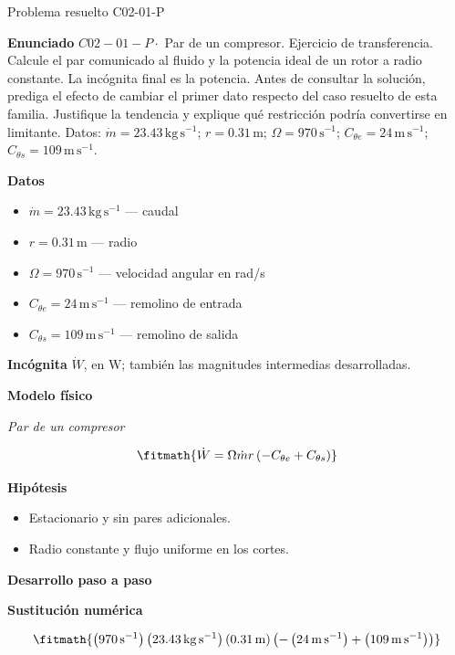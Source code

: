 \documentclass[10pt,openany]{book}
\begin{document}
\begin{studiumworked}{Problema resuelto C02-01-P}


\noindent\textbf{Enunciado}
\(C02-01-P \cdot\) Par de un compresor. Ejercicio de transferencia. Calcule el par comunicado al fluido y la potencia ideal de un rotor a radio constante. La incógnita final es la potencia. Antes de consultar la solución, prediga el efecto de cambiar el primer dato respecto del caso resuelto de esta familia. Justifique la tendencia y explique qué restricción podría convertirse en limitante. Datos: \(\dot m=23.43\, \mathrm{kg}\,\mathrm{s}^{-1}\); \(r=0.31\, \mathrm{m}\); \(\Omega=970\, \mathrm{s}^{-1}\); \(C_{\theta e}=24\, \mathrm{m}\,\mathrm{s}^{-1}\); \(C_{\theta s}=109\, \mathrm{m}\,\mathrm{s}^{-1}\).

\noindent\textbf{Datos}
\begin{itemize}
\item $\dot m = 23.43\,\mathrm{kg}\,\mathrm{s}^{-1}$ — caudal
\item $r = 0.31\,\mathrm{m}$ — radio
\item $\Omega = 970\,\mathrm{s}^{-1}$ — velocidad angular en rad/s
\item $C_{\theta e} = 24\,\mathrm{m}\,\mathrm{s}^{-1}$ — remolino de entrada
\item $C_{\theta s} = 109\,\mathrm{m}\,\mathrm{s}^{-1}$ — remolino de salida
\end{itemize}

\noindent\textbf{Incógnita}
$\dot{W}$, en $\mathrm{W}$; también las magnitudes intermedias desarrolladas.

\noindent\textbf{Modelo físico}

\noindent\textit{Par de un compresor}

\[
\fitmath{\dot{W}=\Omega \dot m r \left(- C_{\theta e} + C_{\theta s}\right)}
\]

\noindent\textbf{Hipótesis}
\begin{itemize}
\item Estacionario y sin pares adicionales.
\item Radio constante y flujo uniforme en los cortes.
\end{itemize}

\noindent\textbf{Desarrollo paso a paso}



\noindent\textbf{Sustitución numérica}

\[
\fitmath{\left(970\,\mathrm{s}^{-1}\right) \left(23.43\,\mathrm{kg}\,\mathrm{s}^{-1}\right) \left(0.31\,\mathrm{m}\right) \left(- \left(24\,\mathrm{m}\,\mathrm{s}^{-1}\right) + \left(109\,\mathrm{m}\,\mathrm{s}^{-1}\right)\right)}
\]


\end{studiumworked}
\end{document}
